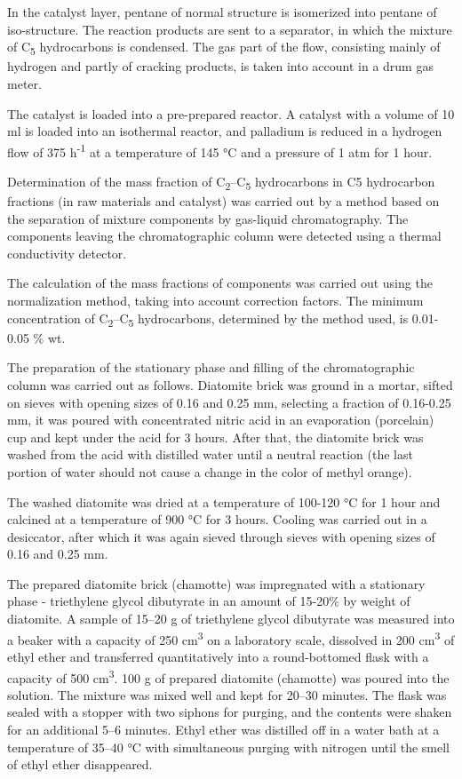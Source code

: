 \begin{multicols}{2}
In the catalyst layer, pentane of normal structure is isomerized into
pentane of iso-structure. The reaction products are sent to a separator,
in which the mixture of C\textsubscript{5} hydrocarbons is condensed.
The gas part of the flow, consisting mainly of hydrogen and partly of
cracking products, is taken into account in a drum gas meter.

The catalyst is loaded into a pre-prepared reactor. A catalyst with a
volume of 10 ml is loaded into an isothermal reactor, and palladium is
reduced in a hydrogen flow of 375 h\textsuperscript{-1} at a temperature
of 145 °C and a pressure of 1 atm for 1 hour.

Determination of the mass fraction of
C\textsubscript{2}--C\textsubscript{5} hydrocarbons in C5 hydrocarbon
fractions (in raw materials and catalyst) was carried out by a method
based on the separation of mixture components by gas-liquid
chromatography. The components leaving the chromatographic column were
detected using a thermal conductivity detector.

The calculation of the mass fractions of components was carried out
using the normalization method, taking into account correction factors.
The minimum concentration of C\textsubscript{2}--C\textsubscript{5}
hydrocarbons, determined by the method used, is 0.01-0.05 \% wt.

The preparation of the stationary phase and filling of the
chromatographic column was carried out as follows. Diatomite brick was
ground in a mortar, sifted on sieves with opening sizes of 0.16 and 0.25
mm, selecting a fraction of 0.16-0.25 mm, it was poured with
concentrated nitric acid in an evaporation (porcelain) cup and kept
under the acid for 3 hours. After that, the diatomite brick was washed
from the acid with distilled water until a neutral reaction (the last
portion of water should not cause a change in the color of methyl
orange).

The washed diatomite was dried at a temperature of 100-120 °C for 1 hour
and calcined at a temperature of 900 °C for 3 hours. Cooling was carried
out in a desiccator, after which it was again sieved through sieves with
opening sizes of 0.16 and 0.25 mm.

The prepared diatomite brick (chamotte) was impregnated with a
stationary phase - triethylene glycol dibutyrate in an amount of 15-20\%
by weight of diatomite. A sample of 15--20 g of triethylene glycol
dibutyrate was measured into a beaker with a capacity of 250
cm\textsuperscript{3} on a laboratory scale, dissolved in 200
cm\textsuperscript{3} of ethyl ether and transferred quantitatively into
a round-bottomed flask with a capacity of 500 cm\textsuperscript{3}. 100
g of prepared diatomite (chamotte) was poured into the solution. The
mixture was mixed well and kept for 20--30 minutes. The flask was sealed
with a stopper with two siphons for purging, and the contents were
shaken for an additional 5--6 minutes. Ethyl ether was distilled off in
a water bath at a temperature of 35--40 °C with simultaneous purging
with nitrogen until the smell of ethyl ether disappeared.


\end{multicols}
